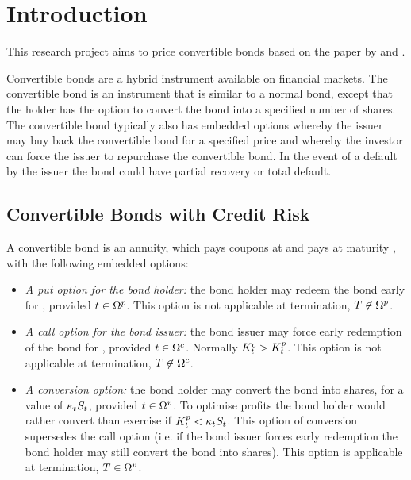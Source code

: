 \documentclass[a4paper,11pt,oneside]{report}
\newcommand{\setlinespacing}[1]
           {\renewcommand{\baselinestretch}{#1}\small\normalsize}
\theoremstyle{plain}
\theoremstyle{definition}
\begin{document}

\setlinespacing{1}
\tableofcontents
\listoffigures
\listoftables
\clearpage
\setlinespacing{1.20}
\setcounter{page}{1}


\chapter{Introduction}
This research project aims to price convertible bonds based on the paper by \citet{AFV03} and \citet{MK12}.

Convertible bonds are a hybrid instrument available on financial markets.  The convertible bond is an instrument that is similar to a normal bond, except that the holder has the option to convert the bond into a specified number of shares.  The convertible bond typically also has embedded options whereby the issuer may buy back the convertible bond for a specified price and whereby the investor can force the issuer to repurchase the convertible bond.  In the event of a default by the issuer the bond could have partial recovery or total default.


\section{Convertible Bonds with Credit Risk}
A convertible bond is an annuity, which pays coupons \C at \ti and pays \R at maturity \T, with the following embedded options:
\begin{itemize}
 \item \emph{A put option for the bond holder:} the bond holder may redeem the bond early for \Kp, provided $t \in \Omega^{p}$.  This option is not applicable at termination, $T \not\in \Omega^{p}$.
 \item \emph{A call option for the bond issuer:} the bond issuer may force early redemption of the bond for \Kc, provided $t \in \Omega^{c}$.  Normally $K^{c}_t > K^{p}_t$.  This option is not applicable at termination, $T \not\in \Omega^{c}$.
 \item \emph{A conversion option:} the bond holder may convert the bond into \Kv shares, for a value of $\kappa_tS_t$, provided $t \in \Omega^{v}$.  To optimise profits the bond holder would rather convert than exercise if $K^{p}_t < \kappa_tS_t$.  This option of conversion supersedes the call option (i.e. if the bond issuer forces early redemption the bond holder may still convert the bond into shares).  This option is applicable at termination, $T \in \Omega^{v}$.
\end{itemize}
\end{document}
